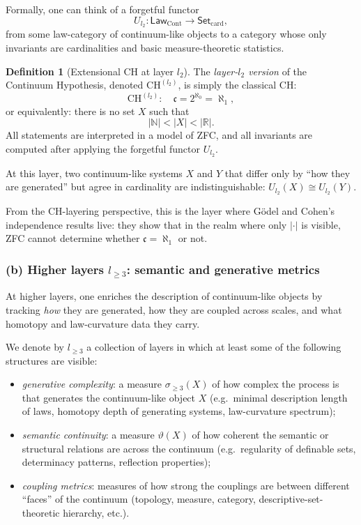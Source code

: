 \documentclass[11pt]{book}
\theoremstyle{plain}
\theoremstyle{definition}
\newtheorem{definition}[theorem]{Definition} \theoremstyle{remark}
\begin{document}
Formally, one can think of a forgetful functor
\[
  U_{l_2} : \mathsf{Law}_{\mathrm{Cont}}
            \longrightarrow
            \mathsf{Set}_{\mathrm{card}},
\]
from some law-category of continuum-like objects to a category whose
only invariants are cardinalities and basic measure-theoretic
statistics.

\begin{definition}[Extensional CH at layer $l_2$]
  The \emph{layer-$l_2$ version} of the Continuum Hypothesis,
  denoted $\mathrm{CH}^{(l_2)}$, is simply the classical CH:
  \[
    \mathrm{CH}^{(l_2)} :\quad
    \mathfrak{c} = 2^{\aleph_0} = \aleph_1,
  \]
  or equivalently: there is no set $X$ such that
  \[
    |\mathbb{N}| < |X| < |\mathbb{R}|.
  \]
  All statements are interpreted in a model of ZFC, and all invariants
  are computed after applying the forgetful functor $U_{l_2}$.
\end{definition}

At this layer, two continuum-like systems $X$ and $Y$ that differ only
by “how they are generated” but agree in cardinality are indistinguish\-able:
$U_{l_2}(X)\cong U_{l_2}(Y)$.

From the CH-layering perspective, this is the layer where Gödel and
Cohen’s independence results live: they show that in the realm where
only $|\cdot|$ is visible, ZFC cannot determine whether
$\mathfrak{c}=\aleph_1$ or not.



\subsubsection*{(b) Higher layers $l_{\ge3}$: semantic and generative metrics}

At higher layers, one enriches the description of continuum-like
objects by tracking \emph{how} they are generated, how they are coupled
across scales, and what homotopy and law-curvature data they carry.

We denote by $l_{\ge3}$ a collection of layers in which at least some
of the following structures are visible:

\begin{itemize}
  \item \emph{generative complexity}: a measure
        $\sigma_{\ge3}(X)$ of how complex the process is that generates
        the continuum-like object $X$ (e.g.\ minimal description length
        of laws, homotopy depth of generating systems, law-curvature
        spectrum);
  \item \emph{semantic continuity}: a measure $\vartheta(X)$ of how
        coherent the semantic or structural relations are across the
        continuum (e.g.\ regularity of definable sets, determinacy
        patterns, reflection properties);
  \item \emph{coupling metrics}: measures of how strong the couplings
        are between different “faces” of the continuum (topology,
        measure, category, descriptive-set-theoretic hierarchy, etc.).
\end{itemize}
\end{document}
